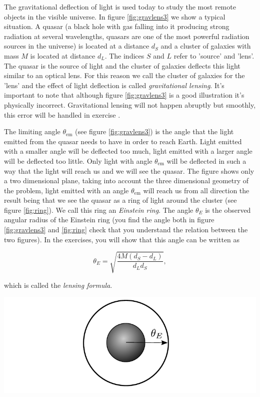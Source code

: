 {\begin{multicols}{2}
The gravitational deflection of light is used today to study the most remote objects in the visible universe. In figure \ref{fig:gravlens3} we show a typical situation. A quasar (a black hole with gas falling into it producing strong radiation at several wavelengths, quasars are one of the most powerful radiation sources in the universe) is located at a distance $d_S$ and a cluster of galaxies with mass $M$ is located at distance $d_L$. The indices $S$ and $L$ refer to 'source' and 'lens'. The quasar is the source of light and the cluster of galaxies deflects this light similar to an optical lens. For this reason we call the cluster of galaxies for the 'lens' and the effect of light deflection is called {\it gravitational lensing}. It's important to note that although figure \ref{fig:gravlens3} is a good illustration it's physically incorrect. Gravitational lensing will not happen abruptly but smoothly, this error will be handled in exercise .

The limiting angle $\theta_\mathrm{em}$ (see figure \ref{fig:gravlens3}) is the angle that the light emitted from the quasar needs to have in order to reach Earth. Light emitted with a smaller angle will be deflected too much, light emitted with a larger angle will be deflected too little. Only light with angle $\theta_\mathrm{em}$ will be deflected in such a way that the light will reach us and we will see the quasar. The figure shows only a two dimensional plane, taking into account the three dimensional geometry of the problem, light emitted with an angle $\theta_\mathrm{em}$ will reach us from all direction the result being that we see the quasar as a ring of light around the cluster (see figure \ref{fig:ring}). We call this ring an {\it Einstein ring}. The angle $\theta_E$ is the observed angular radius of the Einstein ring (you find the angle both in figure \ref{fig:gravlens3} and \ref{fig:ring} check that you understand the relation between the two figures). In the exercises, you will show that this angle can be written as
\begin{formbox}
\begin{equation}
\label{eq:lensing}
\theta_E=\sqrt{\frac{4M(d_S-d_L)}{d_Ld_S}},
\end{equation}
\end{formbox}
which is called the {\it lensing formula}.

\begin{Figure}
\centering
\includegraphics[width=\textwidth]{fig_18-7.pdf}
\end{Figure}


\end{multicols}}
